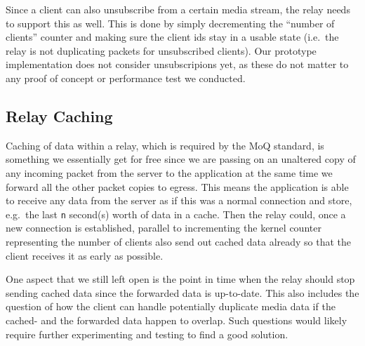 Since a client can also unsubscribe from a certain media stream, the relay needs to support
this as well.
This is done by simply decrementing the ``number of clients'' counter and making sure the 
client ids stay in a usable state (i.e.~the relay is not duplicating packets for unsubscribed 
clients).
Our prototype implementation does not consider unsubscripions yet, as these do not matter to 
any proof of concept or performance test we conducted.

\subsection{Relay Caching}
Caching of data within a relay, which is required by the MoQ standard, is something we essentially get
for free since we are passing on an unaltered copy of any incoming packet from the server to the 
application at the same time we forward all the other packet copies to egress.
This means the application is able to receive any data from the server as if this was a normal connection and 
store, e.g.~the last \verb|n| second(s) worth of data in a cache.
Then the relay could, once a new connection is established, parallel to incrementing the kernel counter 
representing the number of clients also send out cached data already so that the client receives it
as early as possible.

One aspect that we still left open is the point in time when the relay should stop 
sending cached data since the forwarded data is up-to-date.
This also includes the question of how the client can handle potentially duplicate media data if the 
cached- and the forwarded data happen to overlap.
Such questions would likely require further experimenting and testing to find a good solution.
